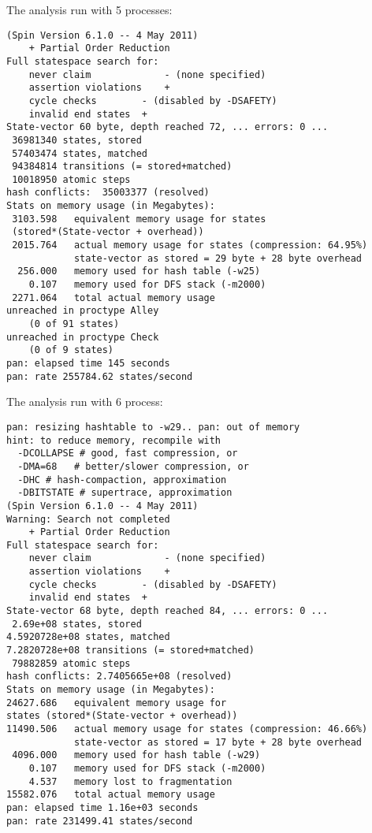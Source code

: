 The analysis run with 5 processes:

\begin{lstlisting}
(Spin Version 6.1.0 -- 4 May 2011)
	+ Partial Order Reduction
Full statespace search for:
	never claim         	- (none specified)
	assertion violations	+
	cycle checks       	- (disabled by -DSAFETY)
	invalid end states	+
State-vector 60 byte, depth reached 72, ... errors: 0 ...
 36981340 states, stored
 57403474 states, matched
 94384814 transitions (= stored+matched)
 10018950 atomic steps
hash conflicts:  35003377 (resolved)
Stats on memory usage (in Megabytes):
 3103.598	equivalent memory usage for states 
 (stored*(State-vector + overhead))
 2015.764	actual memory usage for states (compression: 64.95%)
         	state-vector as stored = 29 byte + 28 byte overhead
  256.000	memory used for hash table (-w25)
    0.107	memory used for DFS stack (-m2000)
 2271.064	total actual memory usage
unreached in proctype Alley
	(0 of 91 states)
unreached in proctype Check
	(0 of 9 states)
pan: elapsed time 145 seconds
pan: rate 255784.62 states/second
\end{lstlisting}

The analysis run with 6 process:
\begin{lstlisting}
pan: resizing hashtable to -w29.. pan: out of memory
hint: to reduce memory, recompile with
  -DCOLLAPSE # good, fast compression, or
  -DMA=68   # better/slower compression, or
  -DHC # hash-compaction, approximation
  -DBITSTATE # supertrace, approximation
(Spin Version 6.1.0 -- 4 May 2011)
Warning: Search not completed
	+ Partial Order Reduction
Full statespace search for:
	never claim         	- (none specified)
	assertion violations	+
	cycle checks       	- (disabled by -DSAFETY)
	invalid end states	+
State-vector 68 byte, depth reached 84, ... errors: 0 ...
 2.69e+08 states, stored
4.5920728e+08 states, matched
7.2820728e+08 transitions (= stored+matched)
 79882859 atomic steps
hash conflicts: 2.7405665e+08 (resolved)
Stats on memory usage (in Megabytes):
24627.686	equivalent memory usage for 
states (stored*(State-vector + overhead))
11490.506	actual memory usage for states (compression: 46.66%)
         	state-vector as stored = 17 byte + 28 byte overhead
 4096.000	memory used for hash table (-w29)
    0.107	memory used for DFS stack (-m2000)
    4.537	memory lost to fragmentation
15582.076	total actual memory usage
pan: elapsed time 1.16e+03 seconds
pan: rate 231499.41 states/second
\end{lstlisting}